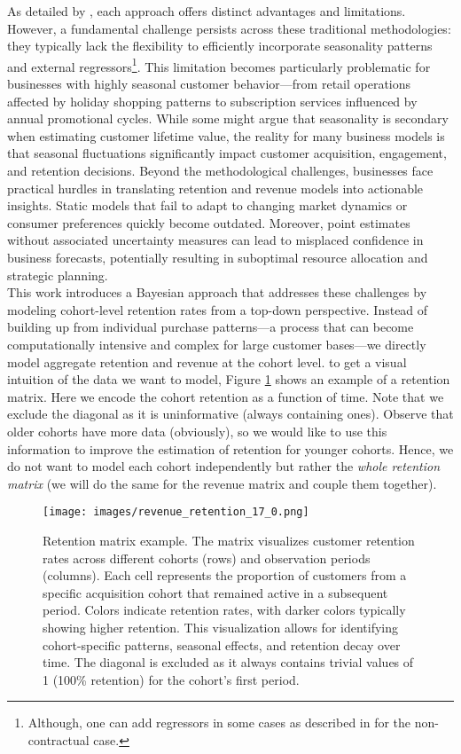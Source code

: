 \documentclass[11pt]{amsart}
\theoremstyle{definition}
\begin{document}
As detailed by \cite{FaderHardieNote2017}, each approach offers distinct advantages and limitations. However, a fundamental
challenge persists across these traditional methodologies: they typically lack the flexibility to efficiently incorporate
seasonality patterns and external regressors\footnote{Although, one can add regressors in some cases as described in
    \cite{FaderHardieNote2007} for the non-contractual case.}. This limitation becomes particularly problematic for businesses
with highly seasonal customer behavior—from retail operations affected by holiday shopping patterns to subscription services
influenced by annual promotional cycles. While some might argue that seasonality is secondary when estimating customer
lifetime value, the reality for many business models is that seasonal fluctuations significantly impact customer acquisition,
engagement, and retention decisions. Beyond the methodological challenges, businesses face practical hurdles in translating
retention and revenue models into actionable insights. Static models that fail to adapt to changing market dynamics or
consumer preferences quickly become outdated. Moreover, point estimates without associated uncertainty measures can lead to
misplaced confidence in business forecasts, potentially resulting in suboptimal resource allocation and strategic planning. \\

This work introduces a Bayesian approach that addresses these challenges by modeling cohort-level retention rates from a
top-down perspective. Instead of building up from individual purchase patterns—a process that can become computationally
intensive and complex for large customer bases—we directly model aggregate retention and revenue at the cohort level.
to get a visual intuition of the data we want to model, Figure \ref{fig:retention_matrix} shows an example of a retention
matrix. Here we encode the cohort retention as a function of time. Note that we exclude the diagonal as it is
uninformative (always containing ones). Observe that older cohorts have more data (obviously), so we would like to use
this information to improve the estimation of retention for younger cohorts. Hence, we do not want to model each cohort
independently but rather the {\em whole retention matrix} (we will do the same for the revenue matrix and couple them
together). \\

\begin{figure}
    \centering
    \texttt{[image: images/revenue\_retention\_17\_0.png]}
    \caption{Retention matrix example. The matrix visualizes customer retention rates across different cohorts (rows) and
        observation periods (columns). Each cell represents the proportion of customers from a specific acquisition
        cohort that remained active in a subsequent period. Colors indicate retention rates, with darker colors typically
        showing higher retention. This visualization allows for identifying cohort-specific patterns, seasonal effects,
        and retention decay over time. The diagonal is excluded as it always contains trivial values of 1 (100\%
        retention) for the cohort's first period.}
    \label{fig:retention_matrix}
\end{figure}
\end{document}
